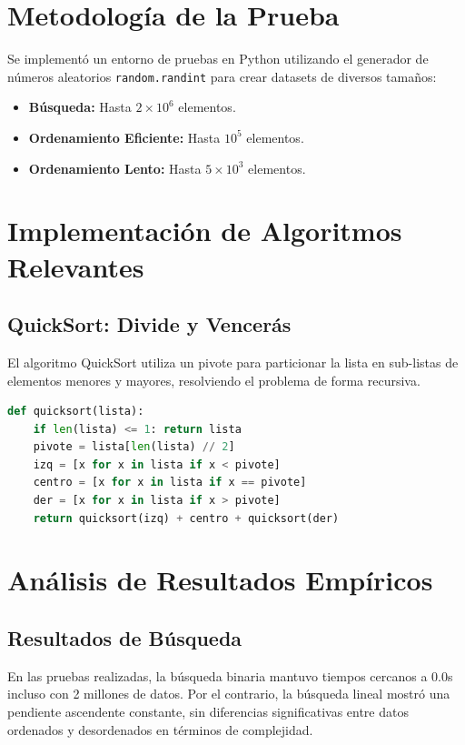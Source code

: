 \documentclass[12pt,a4paper]{article}
\begin{document}
\section{Metodología de la Prueba}
Se implementó un entorno de pruebas en Python utilizando el generador de números aleatorios \texttt{random.randint} para crear datasets de diversos tamaños:
\begin{itemize}
    \item \textbf{Búsqueda:} Hasta $2 \times 10^6$ elementos.
    \item \textbf{Ordenamiento Eficiente:} Hasta $10^5$ elementos.
    \item \textbf{Ordenamiento Lento:} Hasta $5 \times 10^3$ elementos.
\end{itemize}

\section{Implementación de Algoritmos Relevantes}

\subsection{QuickSort: Divide y Vencerás}
El algoritmo QuickSort utiliza un pivote para particionar la lista en sub-listas de elementos menores y mayores, resolviendo el problema de forma recursiva.

\begin{lstlisting}[language=Python]
def quicksort(lista):
    if len(lista) <= 1: return lista
    pivote = lista[len(lista) // 2]
    izq = [x for x in lista if x < pivote]
    centro = [x for x in lista if x == pivote]
    der = [x for x in lista if x > pivote]
    return quicksort(izq) + centro + quicksort(der)
\end{lstlisting}

\section{Análisis de Resultados Empíricos}

\subsection{Resultados de Búsqueda}
En las pruebas realizadas, la búsqueda binaria mantuvo tiempos cercanos a 0.0s incluso con 2 millones de datos. Por el contrario, la búsqueda lineal mostró una pendiente ascendente constante, sin diferencias significativas entre datos ordenados y desordenados en términos de complejidad.
\end{document}
